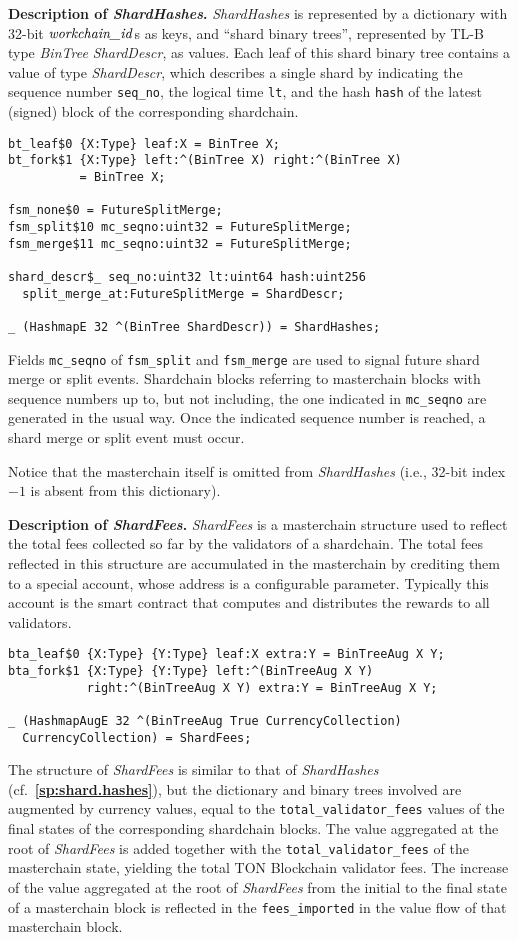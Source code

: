 \documentclass[12pt,oneside]{article}
\def\makepoint#1{\medbreak\noindent{\bf #1.\ }}
\def\nxsubpoint{\refstepcounter{subsubsection}%
  \smallbreak\makepoint{\thesubsubsection}}
\def\refpoint#1{{\rm\textbf{\ref{#1}}}}
\let\ptref=\refpoint
\def\emb#1{\textbf{#1.}}
\let\vr=\textit
\def\workchainid{\vr{workchain\_id\/}}
\begin{document}
\nxsubpoint\label{sp:shard.hashes}\emb{Description of {\em ShardHashes}}
{\em ShardHashes\/} is represented by a dictionary with 32-bit $\workchainid$s as keys, and ``shard binary trees'', represented by TL-B type {\em BinTree ShardDescr}, as values. Each leaf of this shard binary tree contains a value of type {\em ShardDescr}, which describes a single shard by indicating the sequence number {\tt seq\_no}, the logical time {\tt lt}, and the hash {\tt hash} of the latest (signed) block of the corresponding shardchain.
\begin{verbatim}
bt_leaf$0 {X:Type} leaf:X = BinTree X;
bt_fork$1 {X:Type} left:^(BinTree X) right:^(BinTree X) 
          = BinTree X;

fsm_none$0 = FutureSplitMerge;
fsm_split$10 mc_seqno:uint32 = FutureSplitMerge;
fsm_merge$11 mc_seqno:uint32 = FutureSplitMerge;

shard_descr$_ seq_no:uint32 lt:uint64 hash:uint256 
  split_merge_at:FutureSplitMerge = ShardDescr;

_ (HashmapE 32 ^(BinTree ShardDescr)) = ShardHashes;
\end{verbatim}
Fields {\tt mc\_seqno} of {\tt fsm\_split} and {\tt fsm\_merge} are used to signal future shard merge or split events. Shardchain blocks referring to masterchain blocks with sequence numbers up to, but not including, the one indicated in {\tt mc\_seqno} are generated in the usual way. Once the indicated sequence number is reached, a shard merge or split event must occur.

Notice that the masterchain itself is omitted from {\em ShardHashes\/} (i.e., 32-bit index $-1$ is absent from this dictionary).

\nxsubpoint\emb{Description of {\em ShardFees}}
{\em ShardFees\/} is a masterchain structure used to reflect the total fees collected so far by the validators of a shardchain. The total fees reflected in this structure are accumulated in the masterchain by crediting them to a special account, whose address is a configurable parameter. Typically this account is the smart contract that computes and distributes the rewards to all validators.
\begin{verbatim}
bta_leaf$0 {X:Type} {Y:Type} leaf:X extra:Y = BinTreeAug X Y;
bta_fork$1 {X:Type} {Y:Type} left:^(BinTreeAug X Y) 
           right:^(BinTreeAug X Y) extra:Y = BinTreeAug X Y;

_ (HashmapAugE 32 ^(BinTreeAug True CurrencyCollection)
  CurrencyCollection) = ShardFees;
\end{verbatim}
The structure of {\em ShardFees\/} is similar to that of {\em ShardHashes\/} (cf.~\ptref{sp:shard.hashes}), but the dictionary and binary trees involved are augmented by currency values, equal to the {\tt total\_validator\_fees} values of the final states of the corresponding shardchain blocks. The value aggregated at the root of {\em ShardFees\/} is added together with the {\tt total\_validator\_fees} of the masterchain state, yielding the total TON Blockchain validator fees. The increase of the value aggregated at the root of {\em ShardFees\/} from the initial to the final state of a masterchain block is reflected in the {\tt fees\_imported} in the value flow of that masterchain block.
\end{document}
